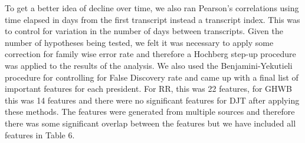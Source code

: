 \documentclass[10pt, letterpaper, twoside, openany]{thesis}
\begin{document}
To get a better idea of decline over time, we also ran Pearson's correlations using time elapsed in days from the first transcript instead a transcript index. This was to control for variation in the number of days between transcripts. Given the number of hypotheses being tested, we felt it was necessary to apply some correction for family wise error rate and therefore a Hochberg step-up procedure was applied to the results of the analysis. We also used the Benjamini-Yekutieli procedure for controlling for False Discovery rate and came up with a final list of important features for each president. For RR, this was 22 features, for GHWB this was 14 features and there were no significant features for DJT after applying these methods.  The features were generated from multiple sources and therefore there was some significant overlap between the features but we have included all features in Table 6. 
\end{document}
